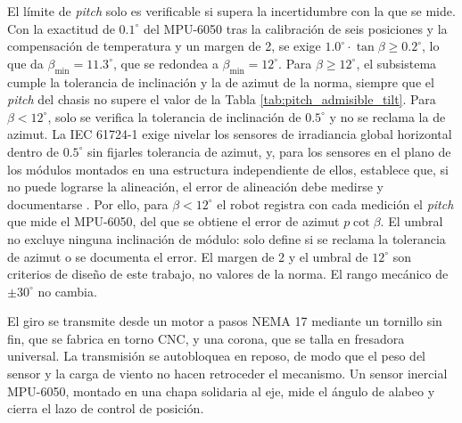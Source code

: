 \documentclass[../../General.tex]{subfiles}
\begin{document}
El límite de \textit{pitch} solo es verificable si supera la incertidumbre con la que se mide. Con la exactitud de $0.1^\circ$ del MPU-6050 tras la calibración de seis posiciones y la compensación de temperatura y un margen de 2, se exige $1.0^\circ \cdot \tan\beta \geq 0.2^\circ$, lo que da $\beta_{\min} = 11.3^\circ$, que se redondea a $\beta_{\min} = 12^\circ$. Para $\beta \geq 12^\circ$, el subsistema cumple la tolerancia de inclinación y la de azimut de la norma, siempre que el \textit{pitch} del chasis no supere el valor de la Tabla \ref{tab:pitch_admisible_tilt}. Para $\beta < 12^\circ$, solo se verifica la tolerancia de inclinación de $0.5^\circ$ y no se reclama la de azimut. La IEC 61724-1 exige nivelar los sensores de irradiancia global horizontal dentro de $0.5^\circ$ sin fijarles tolerancia de azimut, y, para los sensores en el plano de los módulos montados en una estructura independiente de ellos, establece que, si no puede lograrse la alineación, el error de alineación debe medirse y documentarse \citep{IEC61724-1_2021}. Por ello, para $\beta < 12^\circ$ el robot registra con cada medición el \textit{pitch} que mide el MPU-6050, del que se obtiene el error de azimut $p \cot\beta$. El umbral no excluye ninguna inclinación de módulo: solo define si se reclama la tolerancia de azimut o se documenta el error. El margen de 2 y el umbral de $12^\circ$ son criterios de diseño de este trabajo, no valores de la norma. El rango mecánico de $\pm 30^\circ$ no cambia.

El giro se transmite desde un motor a pasos NEMA 17 mediante un tornillo sin fin, que se fabrica en torno CNC, y una corona, que se talla en fresadora universal. La transmisión se autobloquea en reposo, de modo que el peso del sensor y la carga de viento no hacen retroceder el mecanismo. Un sensor inercial MPU-6050, montado en una chapa solidaria al eje, mide el ángulo de alabeo y cierra el lazo de control de posición.
\end{document}
